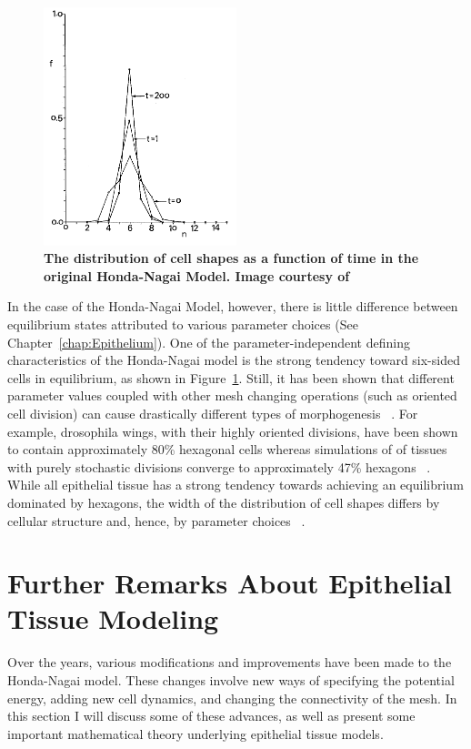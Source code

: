 \begin{figure}[ht]
\centering
\includegraphics[width=0.5\textwidth]{../diagrams/distibutionHonda.png}
\caption[Distribution of Cell Shapes]{\textbf{The distribution of cell shapes as a function of time in the original Honda-Nagai Model. Image courtesy of}~\cite{HondaNagai}}
\label{fig:hnm}
\end{figure}

In the case of the Honda-Nagai Model, however, there is little difference between equilibrium states attributed to various parameter choices (See Chapter~\ref{chap:Epithelium}). One of the parameter-independent defining characteristics of the Honda-Nagai model is the strong tendency toward six-sided cells in equilibrium, as shown in Figure~\ref{fig:hnm}.  Still, it has been shown that different parameter values coupled with other mesh changing operations (such as oriented cell division) can cause drastically different types of morphogenesis ~\cite{Overview}. For example, drosophila wings, with their highly oriented divisions, have been shown to contain approximately 80\% hexagonal cells whereas simulations of of tissues with purely stochastic divisions converge to  approximately 47\% hexagons ~\cite{EpithelialTopology}. While all epithelial tissue has a strong tendency towards achieving an equilibrium dominated by hexagons, the width of the distribution of cell shapes differs by cellular structure and, hence, by parameter choices ~\cite{Soap}. 


\section{Further Remarks About Epithelial Tissue Modeling}
Over the years, various modifications and improvements have been made to the Honda-Nagai model. These changes involve new ways of specifying the potential energy, adding new cell dynamics, and changing the connectivity of the mesh. In this section I will discuss some of these advances, as well as present some important mathematical theory underlying epithelial tissue models.
